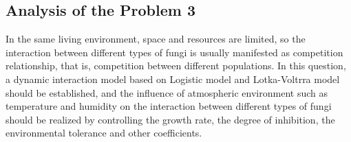 \subsection{Analysis of the Problem 3}
In the same living environment, space and resources are limited, so the interaction between different types of fungi is usually manifested as competition relationship, that is, competition between different populations. In this question, a dynamic interaction model based on Logistic model and Lotka-Voltrra model should be established, and the influence of atmospheric environment such as temperature and humidity on the interaction between different types of fungi should be realized by controlling the growth rate, the degree of inhibition, the environmental tolerance and other coefficients.